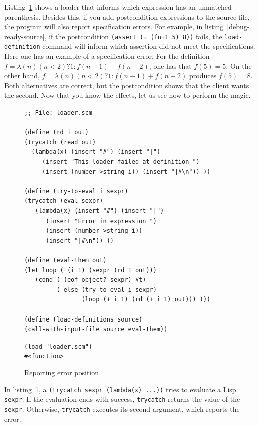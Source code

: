 \documentclass[a4paper,12pt]{book}
\newenvironment{fmpage}[1]
           {\begin{lrbox}{\fmbox}\begin{minipage}{#1}}
           {\end{minipage}\end{lrbox}\fbox{\usebox{\fmbox}}}
\begin{document}
Listing~\ref{error-position} shows a loader
that informs which expression has an unmatched
parenthesis. Besides this, if you add postcondition
expressions to the source file, the program
will also report specification errors.
For example, in listing~\ref{debug-ready-source},
if the postcondition
\verb|(assert (= (fn+1 5) 8))| fails,
the \verb|load-definition| command will
inform which assertion did not meet
the specifications. Here one has an
example of a specification error. 
For the definition
$f= \lambda(n) (n<2) ? 1 : f(n-1)+f(n-2)$,
one has that $f(5)= 5$. On  the other hand, 
$f=\lambda(n) (n<2) ? 1 : f(n-1)+f(n-2)$
produces $f(5)= 8$.
Both alternatives are correct, but the postcondition
shows that the client wants the second.
Now that you know the
effects, let us see how to perform the magic.

\begin{figure}[!h]
\begin{fmpage}{0.9\textwidth}
\begin{verbatim}
;; File: loader.scm

(define (rd i out)
(trycatch (read out) 
  (lambda(x) (insert "#") (insert "|")
     (insert "This loader failed at definition ")
     (insert (number->string i)) (insert "|#\n")) ))

(define (try-to-eval i sexpr)
(trycatch (eval sexpr)
   (lambda(x) (insert "#") (insert "|")
      (insert "Error in expression ")
      (insert (number->string i))
      (insert "|#\n")) ))

(define (eval-them out)
(let loop ( (i 1) (sexpr (rd 1 out)))
   (cond ( (eof-object? sexpr) #t)
         ( else (try-to-eval i sexpr)
                (loop (+ i 1) (rd (+ i 1) out))) )))

(define (load-definitions source)
(call-with-input-file source eval-them))
\end{verbatim}
\end{fmpage}

\begin{fmpage}{0.9\textwidth}
\verb|(load "loader.scm")|\\
\verb|#<function>|\\
\end{fmpage}
\caption{Reporting error position}
\label{error-position}
\end{figure}

In listing~\ref{error-position},
a \verb|(trycatch sexpr (lambda(x) ...))|
tries to evaluate a Lisp \verb|sexpr|.
If the evaluation
ends with success, \verb|trycatch|
returns the value of the \verb|sexpr|.
Otherwise,
\verb|trycatch| executes its second
argument, which reports the error.
\end{document}
